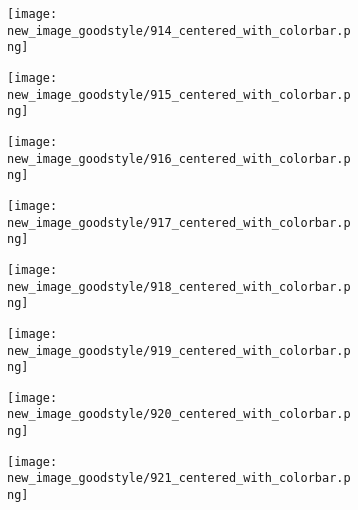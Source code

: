 \documentclass[a4paper,12pt]{article}
\begin{document}
\begin{figure}[H]
  \begin{subfigure}{0.11\textwidth}
    \texttt{[image: new\_image\_goodstyle/914\_centered\_with\_colorbar.png]}
  \end{subfigure}
  \hfill
  \begin{subfigure}{0.11\textwidth}
    \texttt{[image: new\_image\_goodstyle/915\_centered\_with\_colorbar.png]}
  \end{subfigure}
  \hfill
  \begin{subfigure}{0.11\textwidth}
    \texttt{[image: new\_image\_goodstyle/916\_centered\_with\_colorbar.png]}
  \end{subfigure}
  \hfill
  \begin{subfigure}{0.11\textwidth}
    \texttt{[image: new\_image\_goodstyle/917\_centered\_with\_colorbar.png]}
  \end{subfigure}
  \hfill
  \begin{subfigure}{0.11\textwidth}
    \texttt{[image: new\_image\_goodstyle/918\_centered\_with\_colorbar.png]}
  \end{subfigure}
  \hfill
  \begin{subfigure}{0.11\textwidth}
    \texttt{[image: new\_image\_goodstyle/919\_centered\_with\_colorbar.png]}
  \end{subfigure}
  \hfill
  \begin{subfigure}{0.11\textwidth}
    \texttt{[image: new\_image\_goodstyle/920\_centered\_with\_colorbar.png]}
  \end{subfigure}
  \hfill
  \begin{subfigure}{0.11\textwidth}
    \texttt{[image: new\_image\_goodstyle/921\_centered\_with\_colorbar.png]}
  \end{subfigure}
  \hfill
\end{figure}
\end{document}
